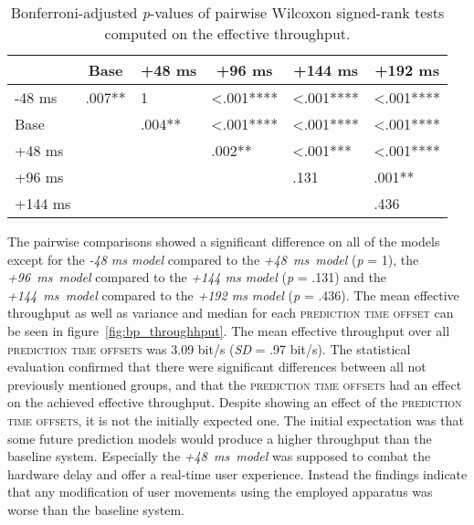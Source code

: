 \documentclass[sigconf]{acmart}
\begin{document}
\begin{table}
\caption{Bonferroni-adjusted \textit{p}-values of pairwise Wilcoxon signed-rank tests computed on the effective throughput.}
\label{table:tp_p}
\begin{tabular}{llllll}
\toprule
         	& \multicolumn{1}{c}{Base} 		& \multicolumn{1}{c}{+48 ms} 	& \multicolumn{1}{c}{+96 ms} 	& \multicolumn{1}{c}{+144 ms} 	& \multicolumn{1}{c}{+192 ms}   \\ \midrule
-48 ms   	& \phantom{<}.007**				& 1		    						& <.001****	 					& <.001****						& <.001****	 					\\
Base     	&       						& \phantom{<}.004**  			& <.001****	 					& <.001****						& <.001****						\\
+48 ms  	&       						&        						& \phantom{<}.002**   			& <.001***	  					& <.001****	   					\\
+96 ms  	&       						&        						&            					& \phantom{<}.131    			& \phantom{<}.001**      		\\
+144 ms 	&       						&        						&            					&            					& \phantom{<}.436      			\\ \bottomrule

\end{tabular}
\end{table}

The pairwise comparisons showed a significant difference on all of the models except for the \textit{-48 ms model} compared to the \mbox{\textit{+48 ms model}} (\textit{p} = 1), the \mbox{\textit{+96 ms model}} compared to the \textit{+144 ms model} (\textit{p} = .131) and the \mbox{\textit{+144 ms model}} compared to the \textit{+192 ms model} (\textit{p} = .436). The mean effective throughput as well as variance and median for each \textsc{prediction time offset} can be seen in figure~\ref{fig:bp_throughhput}. The mean effective throughput over all \textsc{prediction time offsets} was 3.09 bit/s (\textit{SD} = .97 bit/s). 
The statistical evaluation confirmed that there were significant differences between all not previously mentioned groups, and that the \textsc{prediction time offsets} had an effect on the achieved effective throughput. Despite showing an effect of the \textsc{prediction time offsets}, it is not the initially expected one. The initial expectation was that some future prediction models would produce a higher throughput than the baseline system. Especially the \mbox{\textit{+48 ms model}} was supposed to combat the hardware delay and offer a real-time user experience. Instead the findings indicate that any modification of user movements using the employed apparatus was worse than the baseline system.
\end{document}
